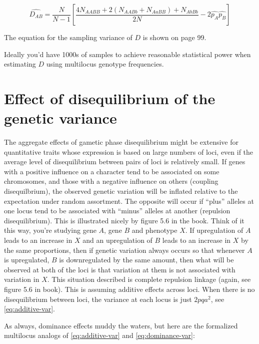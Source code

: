 \documentclass[
]{book}
\begin{document}
\begin{equation}
  \hat{D_{AB}} = \frac{N} {N - 1} [\frac{4N_{AABB} + 2(N_{AABb} + N_{AaBB}) + N_{AbBb}} {2N} -2\hat{p_{A}}\hat{p_{B}}]
  \label{eq:LD-from-genotypes}
\end{equation}

The equation for the sampling variance of \(D\) is shown on page 99.

Ideally you'd have 1000s of samples to achieve reasonable statistical power when estimating \(D\) using multilocus genotype frequencies.

\hypertarget{effect-of-disequilibrium-of-the-genetic-variance}{%
\section{Effect of disequilibrium of the genetic variance}\label{effect-of-disequilibrium-of-the-genetic-variance}}

The aggregate effects of gametic phase disequilibrium might be extensive for quantitative traits whose expression is based on large numbers of loci, even if the average level of disequilibrium between pairs of loci is relatively small. If genes with a positive influence on a character tend to be associated on some chromosomes, and those with a negative influence on others (coupling disequilbrium), the observed genetic variation will be inflated relative to the expectation under random assortment. The opposite will occur if ``plus'' alleles at one locus tend to be associated with ``minus'' alleles at another (repulsion disequilibrium). This is illustrated nicely by figure 5.6 in the book. Think of it this way, you're studying gene \(A\), gene \(B\) and phenotype \(X\). If upregulation of \(A\) leads to an increase in \(X\) and an upregulation of \(B\) leads to an increase in \(X\) by the same proportions, then if genetic variation always occurs so that whenever \(A\) is upregulated, \(B\) is downregulated by the same amount, then what will be observed at both of the loci is that variation at them is not associated with variation in \(X\). This situation described is complete repulsion linkage (again, see figure 5.6 in book). This is assuming additive effects across loci. When there is no disequilibrium between loci, the variance at each locus is just \(2pqa^{2}\), see \eqref{eq:additive-var}.

As always, dominance effects muddy the waters, but here are the formalized multilocus analogs of \eqref{eq:additive-var} and \eqref{eq:dominance-var}:
\end{document}

